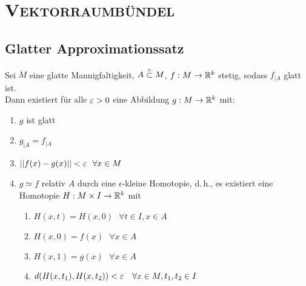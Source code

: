 \setcounter{chapter}{3}
\chapter{\textsc{Vektorraumbündel}}
\section{Glatter Approximationssatz}

\Prop{}
Sei $M$ eine glatte Mannigfaltigkeit, $A \overset{c}{\subset} M$, $f : M \overset{}{\rightarrow} \mathbb{R}^k$ stetig, sodass $f_{|A}$ glatt ist.\\
Dann existiert für alle $\varepsilon > 0$ eine Abbildung $g : M \overset{{}}{\rightarrow} \mathbb{R}^k$ mit:
\begin{enumerate}[1.)]
	\item $g$ ist glatt
	\item $g_{|A} = f_{|A}$
	\item $\left|\left|f(x) - g(x)\right|\right| < \varepsilon ~~\forall x \in M$
	\item $g \simeq f$ relativ $A$ durch eine $\epsilon$-kleine Homotopie, d.\,h., es existiert eine Homotopie $H : M \times I \overset{}{\rightarrow} \mathbb{R}^k$ mit
	\begin{enumerate}
		\item $H(x,t) = H(x,0) ~~~\forall t \in I,x \in A $
		\item $H(x,0) = f(x)~~~\forall x \in A$
		\item $H(x,1) = g(x)~~~\forall x \in A$
		\item $d(H(x,t_1), H(x, t_2)) < \varepsilon ~~~ \forall x \in M, t_1, t_2 \in I $
	\end{enumerate} 
\end{enumerate}
